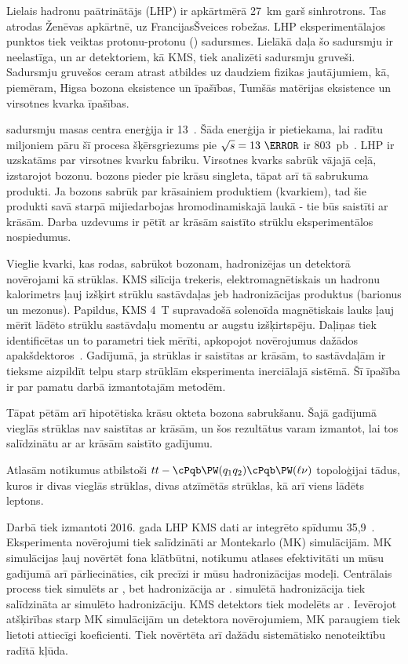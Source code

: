 \vskip 1.5cm
\medskip
{}

Lielais hadronu paātrinātājs (LHP) ir apkārtmērā 27~km garš sinhrotrons. Tas atrodas Ženēvas apkārtnē, uz Francijas\textendash Šveices robežas. LHP eksperimentālajos punktos tiek veiktas protonu-protonu (\Pp\Pp) sadursmes. Lielākā daļa šo sadursmju ir neelastīga, un ar detektoriem, kā KMS, tiek analizēti sadursmju gruveši. Sadursmju gruvešos ceram atrast atbildes uz daudziem fizikas jautājumiem, kā, piemēram, Higsa bozona eksistence un īpašības, Tumšās matērijas eksistence un virsotnes kvarka īpašības.

\Pp\Pp sadursmju masas centra enerģija ir 13~\TeV. Šāda enerģija ir pietiekama, lai radītu miljoniem \ttbar pāru \textendash šī procesa šķērsgriezums pie $\sqrt{s}=13~\TeV$ ir 803~pb~\cite{Sirunyan:2018goh}. LHP ir uzskatāms par \gls{virsotnes kvarku} fabriku. Virsotnes kvarks sabrūk vājajā ceļā, izstarojot \PW bozonu. \PW bozons pieder pie krāsu singleta, tāpat arī tā sabrukuma produkti. Ja \PW bozons sabrūk par krāsainiem produktiem (kvarkiem), tad šie produkti savā starpā mijiedarbojas hromodinamiskajā laukā - tie būs saistīti ar krāsām. Darba uzdevums ir pētīt ar krāsām saistīto strūklu eksperimentālos nospiedumus.

Vieglie kvarki, kas rodas, sabrūkot \PW bozonam, hadronizējas un detektorā novērojami kā \gls{strūklas}. KMS silīcija trekeris, elektromagnētiskais un hadronu kalorimetrs ļauj izšķirt strūklu sastāvdaļas jeb hadronizācijas produktus (barionus un mezonus). Papildus, KMS 4~T supravadošā solenoīda magnētiskais lauks ļauj mērīt lādēto strūklu sastāvdaļu momentu ar augstu izšķirtspēju. Daļiņas tiek identificētas un to parametri tiek mērīti, apkopojot novērojumus dažādos apakšdektoros~\cite{Sirunyan:2017ulk}. Gadījumā, ja strūklas ir saistītas ar krāsām, to sastāvdaļām ir tieksme aizpildīt telpu starp strūklām eksperimenta inerciālajā sistēmā. Šī īpašība ir par pamatu darbā izmantotajām metodēm.

Tāpat pētām arī hipotētiska krāsu okteta \PW bozona sabrukšanu. Šajā gadījumā vieglās strūklas nav saistītas ar krāsām, un šos rezultātus varam izmantot, lai tos salīdzinātu ar ar krāsām saistīto gadījumu.

Atlasām notikumus atbilstoši $tt-\cPqb\PW(q_1q_2)\cPqb\PW(\ell\nu)$ topoloģijai \textendash tādus, kuros ir divas vieglās strūklas, divas \cPqb atzīmētās strūklas, kā arī viens lādēts leptons.

Darbā tiek izmantoti 2016. gada LHP KMS dati ar integrēto spīdumu 35,9~\fbinv. Eksperimenta novērojumi tiek salīdzināti ar Montekarlo (MK) simulācijām. MK simulācijas ļauj novērtēt fona klātbūtni, notikumu atlases efektivitāti un mūsu gadījumā arī pārliecināties, cik precīzi ir mūsu hadronizācijas modeļi. Centrālais process tiek simulēts ar \POWHEG, bet hadronizācija ar \PYTHIA. \PYTHIA simulētā hadronizācija tiek salīdzināta ar \HERWIGpp simulēto hadronizāciju. KMS detektors tiek modelēts ar \GEANTfour. Ievērojot atšķirības starp MK simulācijām un detektora novērojumiem, MK paraugiem tiek lietoti attiecīgi koeficienti. Tiek novērtēta arī dažādu sistemātisko nenoteiktību radītā kļūda.

